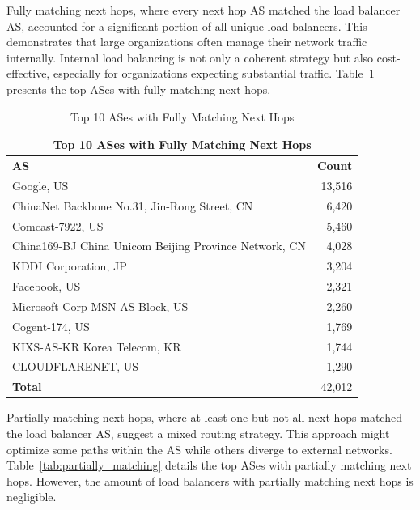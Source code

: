 \documentclass[12pt]{cwru_thesis}
\begin{document}
Fully matching next hops, where every next hop AS matched the load balancer AS, accounted for a significant portion of all unique load balancers. This demonstrates that large organizations often manage their network traffic internally. Internal load balancing is not only a coherent strategy but also cost-effective, especially for organizations expecting substantial traffic. 
Table~\ref{tab:fully_matching} presents the top ASes with fully matching next hops.

\begin{table}[h!]
    \centering
    \begin{tabular}{|l|r|}
        \hline
        \multicolumn{2}{|c|}{\textbf{Top 10 ASes with Fully Matching Next Hops}} \\
        \hline
        \textbf{AS} & \textbf{Count} \\
        \hline
        Google, US & 13,516 \\
        ChinaNet Backbone No.31, Jin-Rong Street, CN & 6,420 \\
        Comcast-7922, US & 5,460 \\
        China169-BJ China Unicom Beijing Province Network, CN & 4,028 \\
        KDDI Corporation, JP & 3,204 \\
        Facebook, US & 2,321 \\
        Microsoft-Corp-MSN-AS-Block, US & 2,260 \\
        Cogent-174, US & 1,769 \\
        KIXS-AS-KR Korea Telecom, KR & 1,744 \\
        CLOUDFLARENET, US  & 1,290 \\
        \hline
        \textbf{Total} & 42,012 \\
        \hline
    \end{tabular}
    \caption{Top 10 ASes with Fully Matching Next Hops}
    \label{tab:fully_matching}
\end{table}

Partially matching next hops, where at least one but not all next hops matched the load balancer AS, suggest a mixed routing strategy. This approach might optimize some paths within the AS while others diverge to external networks. Table~\ref{tab:partially_matching} details the top ASes with partially matching next hops. However, the amount of load balancers with partially matching next hops is negligible. 
\newpage
\end{document}
